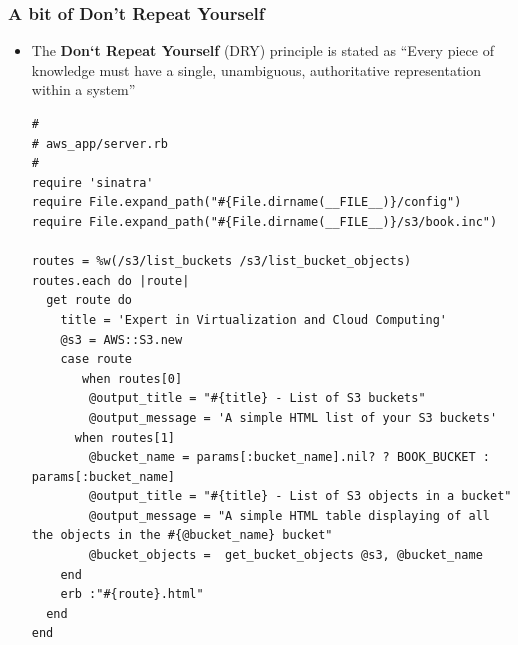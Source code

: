 \documentclass{beamer}
\begin{document}
\begin{frame}
\frametitle{A bit of Don't Repeat Yourself}
\begin{itemize}
 \item The \textbf{Don`t Repeat Yourself} (DRY) principle is stated as ``Every piece of knowledge must have a single, unambiguous, authoritative representation within a system''

\lstset{language=Ruby, style=eclipse}
\begin{lstlisting}[escapechar=!]
#
# aws_app/server.rb
#
require 'sinatra'
require File.expand_path("#{File.dirname(__FILE__)}/config")
require File.expand_path("#{File.dirname(__FILE__)}/s3/book.inc")

routes = %w(/s3/list_buckets /s3/list_bucket_objects)
routes.each do |route|
  get route do
    title = 'Expert in Virtualization and Cloud Computing'
    @s3 = AWS::S3.new
    case route
       when routes[0]
        @output_title = "#{title} - List of S3 buckets"
        @output_message = 'A simple HTML list of your S3 buckets'
      when routes[1]
        @bucket_name = params[:bucket_name].nil? ? BOOK_BUCKET : params[:bucket_name]
        @output_title = "#{title} - List of S3 objects in a bucket"
        @output_message = "A simple HTML table displaying of all the objects in the #{@bucket_name} bucket"
        @bucket_objects =  get_bucket_objects @s3, @bucket_name
    end
    erb :"#{route}.html"
  end
end
\end{lstlisting}
\end{itemize}

\end{frame}

\end{document}
